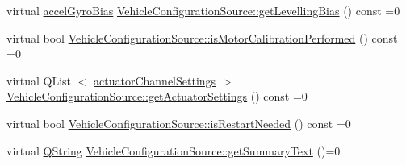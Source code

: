 \begin{DoxyCompactItemize}
\item 
virtual \hyperlink{structaccel_gyro_bias}{accel\-Gyro\-Bias} \hyperlink{group___vehicle_configuration_source_gae596e5378b9bc9d126c6c6207f473567}{\-Vehicle\-Configuration\-Source\-::get\-Levelling\-Bias} () const =0
\item 
virtual bool \hyperlink{group___vehicle_configuration_source_gaf2d0f922c260a7bd4481d565f1b46589}{\-Vehicle\-Configuration\-Source\-::is\-Motor\-Calibration\-Performed} () const =0
\item 
virtual \-Q\-List\*
$<$ \hyperlink{structactuator_channel_settings}{actuator\-Channel\-Settings} $>$ \hyperlink{group___vehicle_configuration_source_ga21ab7c07bd3271df54d776b80b974a0f}{\-Vehicle\-Configuration\-Source\-::get\-Actuator\-Settings} () const =0
\item 
virtual bool \hyperlink{group___vehicle_configuration_source_ga53deeed450e4e532d976fde372be6a54}{\-Vehicle\-Configuration\-Source\-::is\-Restart\-Needed} () const =0
\item 
virtual \hyperlink{group___u_a_v_objects_plugin_gab9d252f49c333c94a72f97ce3105a32d}{\-Q\-String} \hyperlink{group___vehicle_configuration_source_ga1f54adbaeda45aac3778c52569dfa2f9}{\-Vehicle\-Configuration\-Source\-::get\-Summary\-Text} ()=0
\end{DoxyCompactItemize}
